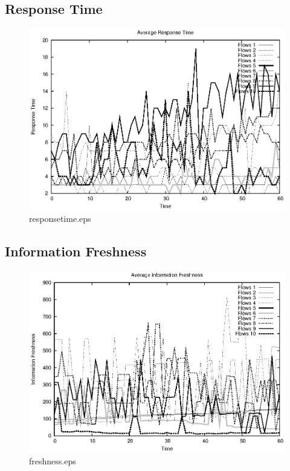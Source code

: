 \documentclass{elsart}
\begin{document}
\clearpage
\subsection{Response Time}

\begin{figure}[ht]
\centering
\includegraphics{Scenario2PullFromStorage/responsetime.eps}
\caption{responsetime.eps}\label{fig:responsetime}
\end{figure}

\clearpage
\subsection{Information Freshness}

\begin{figure}[ht]
\centering
\includegraphics{Scenario2PullFromStorage/freshness.eps}
\caption{freshness.eps}\label{fig:freshness}
\end{figure}
\end{document}
